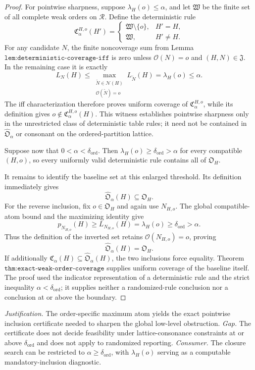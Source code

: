 \documentclass{article}
\begin{document}
\begin{proof}
For pointwise sharpness, suppose \(\lambda_H(o)\le\alpha\), and let \(\mathfrak W\) be the finite set of all complete weak orders on \(\mathcal R\). Define the deterministic rule
\[
 \mathfrak C^{H,o}_\alpha(H')=
 \begin{cases}
  \mathfrak W\setminus\{o\},&H'=H,\\
  \mathfrak W,&H'\ne H.
 \end{cases}
\]
For any candidate \(N\), the finite noncoverage sum from Lemma \(\texttt{lem:deterministic-coverage-iff}\) is zero unless \(\mathcal O(N)=o\) and \((H,N)\in\mathfrak J\). In the remaining case it is exactly
\[
 L_N(H)\le
 \max_{\substack{\widetilde N\in\mathcal N(H)\\
                  \mathcal O(\widetilde N)=o}}
 L_{\widetilde N}(H)
 =\lambda_H(o)\le\alpha.
\]
The iff characterization therefore proves uniform coverage of \(\mathfrak C^{H,o}_\alpha\), while its definition gives \(o\notin\mathfrak C^{H,o}_\alpha(H)\). This witness establishes pointwise sharpness only in the unrestricted class of deterministic table rules; it need not be contained in \(\widehat{\mathfrak O}_\alpha\) or consonant on the ordered-partition lattice.

Suppose now that \(0<\alpha<\delta_{\mathrm{ord}}\). Then \(\lambda_H(o)\ge\delta_{\mathrm{ord}}>\alpha\) for every compatible \((H,o)\), so every uniformly valid deterministic rule contains all of \(\mathfrak O_H\).

It remains to identify the baseline set at this enlarged threshold. Its definition immediately gives
\[
 \widehat{\mathfrak O}_\alpha(H)\subseteq\mathfrak O_H.
\]
For the reverse inclusion, fix \(o\in\mathfrak O_H\) and again use \(N_{H,o}\). The global compatible-atom bound and the maximizing identity give
\[
 p_{N_{H,o}}(H)
 \ge L_{N_{H,o}}(H)
 =\lambda_H(o)
 \ge\delta_{\mathrm{ord}}
 >\alpha.
\]
Thus the definition of the inverted set retains \(\mathcal O(N_{H,o})=o\), proving
\[
 \widehat{\mathfrak O}_\alpha(H)=\mathfrak O_H.
\]
If additionally \(\mathfrak C_\alpha(H)\subseteq\widehat{\mathfrak O}_\alpha(H)\), the two inclusions force equality. Theorem \(\texttt{thm:exact-weak-order-coverage}\) supplies uniform coverage of the baseline itself. The proof used the indicator representation of a deterministic rule and the strict inequality \(\alpha<\delta_{\mathrm{ord}}\); it supplies neither a randomized-rule conclusion nor a conclusion at or above the boundary.
\end{proof}
\par\smallskip\noindent \textit{Justification.} The order-specific maximum atom yields the exact pointwise inclusion certificate needed to sharpen the global low-level obstruction. \textit{Gap.} The certificate does not decide feasibility under lattice-consonance constraints at or above \(\delta_{\mathrm{ord}}\) and does not apply to randomized reporting. \textit{Consumer.} The closure search can be restricted to \(\alpha\ge\delta_{\mathrm{ord}}\), with \(\lambda_H(o)\) serving as a computable mandatory-inclusion diagnostic.
\end{document}
